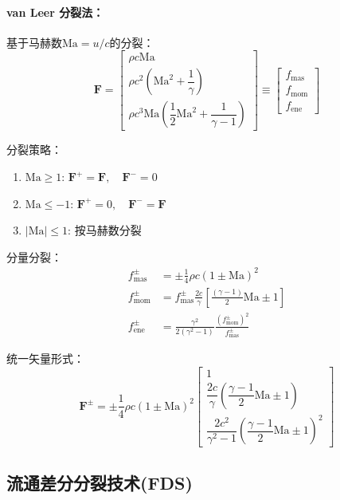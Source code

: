 \documentclass[12pt,a4paper]{article}
\begin{document}
\paragraph{van Leer 分裂法：}

基于马赫数$\mathrm{Ma} = u/c$的分裂：
$$
\mathbf{F} = \begin{bmatrix}
\rho c \mathrm{Ma} \\
\rho c^{2}\left(\mathrm{Ma}^{2} + \dfrac{1}{\gamma}\right) \\
\rho c^{3} \mathrm{Ma}\left(\dfrac{1}{2}\mathrm{Ma}^{2} + \dfrac{1}{\gamma-1}\right)
\end{bmatrix} \equiv \begin{bmatrix}
f_{\text{mas}} \\
f_{\text{mom}} \\
f_{\text{ene}}
\end{bmatrix}
$$

分裂策略：
\begin{enumerate}
\item $\mathrm{Ma} \geq 1$: $\mathbf{F}^{+} = \mathbf{F},\quad \mathbf{F}^{-} = 0$
\item $\mathrm{Ma} \leq -1$: $\mathbf{F}^{+} = 0,\quad \mathbf{F}^{-} = \mathbf{F}$
\item $|\mathrm{Ma}| \leq 1$: 按马赫数分裂
\end{enumerate}

分量分裂：
\begin{align*}
f_{\text{mas}}^{\pm} &= \pm\frac{1}{4} \rho c(1 \pm \mathrm{Ma})^{2} \\
f_{\text{mom}}^{\pm} &= f_{\text{mas}}^{\pm} \frac{2c}{\gamma} \left[ \frac{(\gamma-1)}{2} \mathrm{Ma} \pm 1 \right] \\
f_{\text{ene}}^{\pm} &= \frac{\gamma^{2}}{2(\gamma^{2}-1)} \frac{(f_{\text{mom}}^{\pm})^{2}}{f_{\text{mas}}^{\pm}}
\end{align*}

统一矢量形式：
$$
\mathbf{F}^{\pm} = \pm\frac{1}{4}\rho c(1 \pm \mathrm{Ma})^{2}
\begin{bmatrix}
1 \\
\dfrac{2c}{\gamma} \left( \dfrac{\gamma-1}{2}\mathrm{Ma} \pm 1 \right) \\
\dfrac{2c^{2}}{\gamma^{2}-1} \left( \dfrac{\gamma-1}{2}\mathrm{Ma} \pm 1 \right)^{2}
\end{bmatrix}
$$
\subsection{流通差分分裂技术(FDS)}
\end{document}
